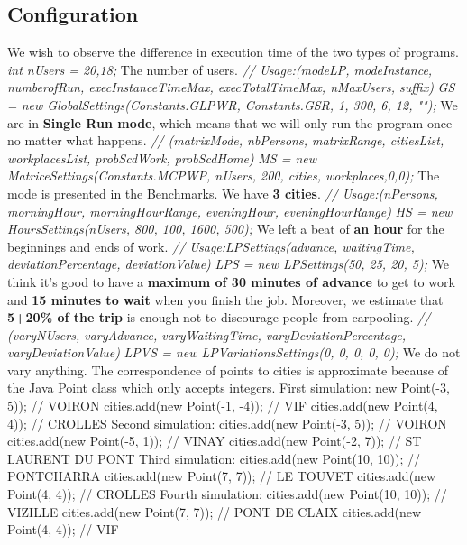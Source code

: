 \documentclass[12pt, a4paper, twoside]{memoir}
\newcommand{\newpar}{\vskip 0.2in \noindent}
\newcommand\tab[1][1cm]{\hspace*{#1}}
\begin{document}
{	\subsection{Configuration}
	We wish to observe the difference in execution time of the two types of programs.
	\newpar
	\tab \textit{int nUsers = {20,18};}\newline
	The number of users.
	\newpar
	\tab \textit{// Usage:(modeLP, modeInstance, numberofRun, execInstanceTimeMax, execTotalTimeMax, nMaxUsers, suffix)}\newline
	\tab \textit{GS = new GlobalSettings(Constants.GLPWR, Constants.GSR, 1, 300, 6, 12, "");}\newline
	We are in \textbf{Single Run mode}, which means that we will only run the program once no matter what happens.
	\newpar
	\tab \textit{// (matrixMode, nbPersons, matrixRange, citiesList, workplacesList, probScdWork, probScdHome)}\newline
	\tab \textit{MS = new MatriceSettings(Constants.MCPWP, nUsers, 200, cities, workplaces,0,0);}\newline
	The mode is presented in the Benchmarks. We have \textbf{3 cities}.
	\newpar
	\tab \textit{// Usage:(nPersons, morningHour, morningHourRange, eveningHour, eveningHourRange)}\newline
	\tab \textit{HS = new HoursSettings(nUsers, 800, 100, 1600, 500);}\newline
	We left a beat of \textbf{an hour} for the beginnings and ends of work.
	\newpar
	\tab \textit{// Usage:LPSettings(advance, waitingTime, deviationPercentage, deviationValue)}\newline
	\tab \textit{LPS = new LPSettings(50, 25, 20, 5);}\newline
	We think it's good to have a \textbf{maximum of 30 minutes of advance} to get to work and \textbf{15 minutes to wait} when you finish the job. Moreover, we estimate that \textbf{5+20\% of the trip} is enough not to discourage people from carpooling.
	\newpar
	\tab \textit{// (varyNUsers, varyAdvance, varyWaitingTime, varyDeviationPercentage, varyDeviationValue)}\newline
	\tab \textit{LPVS = new LPVariationsSettings(0, 0, 0, 0, 0);}\newline
	We do not vary anything.
	\newpar
	The correspondence of points to cities is approximate because of the Java Point class which only accepts integers. \newline
	First simulation:
	\tab new Point(-3, 5)); // VOIRON
	\tab cities.add(new Point(-1, -4)); // VIF
	\tab cities.add(new Point(4, 4)); // CROLLES
	\newpar
	Second simulation:
	\tab cities.add(new Point(-3, 5)); // VOIRON
	\tab cities.add(new Point(-5, 1)); // VINAY
	\tab cities.add(new Point(-2, 7)); // ST LAURENT DU PONT
	\newpar
	Third simulation:
	\tab cities.add(new Point(10, 10)); // PONTCHARRA
	\tab cities.add(new Point(7, 7)); // LE TOUVET
	\tab cities.add(new Point(4, 4)); // CROLLES
	\newpar
	Fourth simulation:
	\tab cities.add(new Point(10, 10)); // VIZILLE
	\tab cities.add(new Point(7, 7)); // PONT DE CLAIX
	\tab cities.add(new Point(4, 4)); // VIF
}
\end{document}
